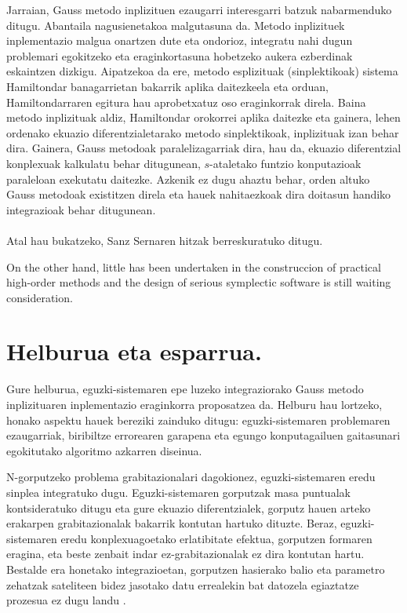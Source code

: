 Jarraian, Gauss metodo inplizituen ezaugarri interesgarri batzuk nabarmenduko ditugu. Abantaila nagusienetakoa malgutasuna da.  Metodo inplizituek inplementazio malgua onartzen dute eta ondorioz, integratu nahi dugun problemari egokitzeko eta eraginkortasuna hobetzeko aukera ezberdinak eskaintzen dizkigu. Aipatzekoa da ere, metodo esplizituak (sinplektikoak) sistema Hamiltondar banagarrietan bakarrik aplika daitezkeela eta orduan, Hamiltondarraren egitura hau aprobetxatuz oso eraginkorrak direla. Baina metodo inplizituak aldiz, Hamiltondar orokorrei aplika daitezke eta gainera, lehen ordenako ekuazio diferentzialetarako  metodo sinplektikoak, inplizituak izan behar dira. Gainera, Gauss metodoak paralelizagarriak dira, hau da, ekuazio diferentzial konplexuak kalkulatu behar ditugunean, $s$-ataletako funtzio konputazioak paraleloan exekutatu daitezke. Azkenik ez dugu ahaztu behar, orden altuko Gauss metodoak existitzen direla  eta hauek nahitaezkoak dira doitasun handiko integrazioak behar ditugunean.     

\paragraph*{}Atal hau bukatzeko, Sanz Sernaren   hitzak berreskuratuko ditugu. 
\begin{displayquote}
On the other hand, little has been undertaken in the construccion of practical high-order methods and the design of serious symplectic software is still waiting consideration.
\end{displayquote}

\section{Helburua eta esparrua.}

Gure helburua, eguzki-sistemaren epe luzeko integraziorako Gauss metodo inplizituaren inplementazio eraginkorra proposatzea da. Helburu hau lortzeko, honako aspektu hauek bereziki zainduko ditugu: eguzki-sistemaren problemaren ezaugarriak, biribiltze errorearen garapena eta egungo konputagailuen gaitasunari egokitutako algoritmo azkarren diseinua.  

N-gorputzeko problema grabitazionalari dagokionez, eguzki-sistemaren eredu sinplea integratuko dugu. Eguzki-sistemaren gorputzak masa puntualak kontsideratuko ditugu eta gure ekuazio diferentzialek, gorputz hauen arteko erakarpen grabitazionalak bakarrik kontutan hartuko dituzte. Beraz, eguzki-sistemaren eredu konplexuagoetako erlatibitate efektua, gorputzen formaren eragina, eta beste zenbait indar ez-grabitazionalak ez dira kontutan hartu.
Bestalde era honetako integrazioetan, gorputzen hasierako balio eta parametro zehatzak sateliteen bidez jasotako datu errealekin bat datozela egiaztatze prozesua ez dugu landu \cite{Laskar2015}.

